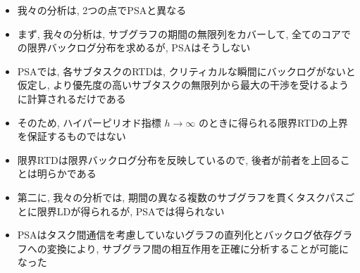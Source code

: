 \begin{frame}{}
    \begin{itemize}
        \item 我々の分析は, 2つの点でPSAと異なる
\item まず, 我々の分析は, サブグラフの期間の無限列をカバーして, 全てのコアでの限界バックログ分布を求めるが, PSAはそうしない
\item PSAでは, 各サブタスクのRTDは, クリティカルな瞬間にバックログがないと仮定し, より優先度の高いサブタスクの無限列から最大の干渉を受けるように計算されるだけである
\item そのため, ハイパーピリオド指標 $h \rightarrow \infty$ のときに得られる限界RTDの上界を保証するものではない
\item 限界RTDは限界バックログ分布を反映しているので, 後者が前者を上回ることは明らかである
\item 第二に, 我々の分析では, 期間の異なる複数のサブグラフを貫くタスクパスごとに限界LDが得られるが, PSAでは得られない
\item PSAはタスク間通信を考慮していないグラフの直列化とバックログ依存グラフへの変換により, サブグラフ間の相互作用を正確に分析することが可能になった
    \end{itemize}
\end{frame}

